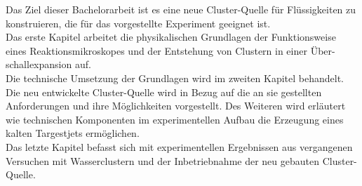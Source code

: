 Das Ziel dieser Bachelorarbeit ist es eine neue Cluster-Quelle für Flüssigkeiten zu konstruieren, die für das vorgestellte Experiment geeignet ist.\\

Das erste Kapitel arbeitet die physikalischen Grundlagen der Funktionsweise eines Reaktionsmikroskopes und der Entstehung von Clustern in einer Über-schallexpansion auf. \\
Die technische Umsetzung der Grundlagen wird im zweiten Kapitel behandelt. Die neu entwickelte Cluster-Quelle wird in Bezug auf die an sie gestellten Anforderungen und ihre Möglichkeiten vorgestellt. Des Weiteren wird erläutert wie technischen Komponenten im experimentellen Aufbau die Erzeugung eines kalten Targestjets ermöglichen.\\
Das letzte Kapitel befasst sich mit experimentellen Ergebnissen aus vergangenen Versuchen mit Wasserclustern und der Inbetriebnahme der neu gebauten Cluster-Quelle.